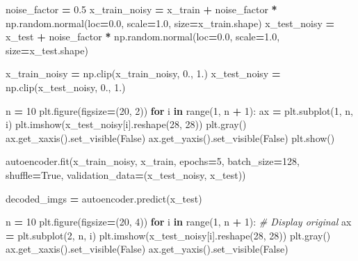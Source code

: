 \documentclass[
  a4paper,
  DIV=11,
  numbers=noendperiod]{scrreprt}
\newenvironment{Shaded}{\begin{snugshade}}{\end{snugshade}}
\newcommand{\BuiltInTok}[1]{#1}
\newcommand{\CommentTok}[1]{\textcolor[rgb]{0.56,0.35,0.01}{\textit{#1}}}
\newcommand{\ControlFlowTok}[1]{\textcolor[rgb]{0.13,0.29,0.53}{\textbf{#1}}}
\newcommand{\DecValTok}[1]{\textcolor[rgb]{0.00,0.00,0.81}{#1}}
\newcommand{\FloatTok}[1]{\textcolor[rgb]{0.00,0.00,0.81}{#1}}
\newcommand{\KeywordTok}[1]{\textcolor[rgb]{0.13,0.29,0.53}{\textbf{#1}}}
\newcommand{\NormalTok}[1]{#1}
\newcommand{\OperatorTok}[1]{\textcolor[rgb]{0.81,0.36,0.00}{\textbf{#1}}}
\newcommand{\VariableTok}[1]{\textcolor[rgb]{0.00,0.00,0.00}{#1}}
\begin{document}
\begin{Shaded}
\begin{Highlighting}[numbers=left,,]
\NormalTok{noise\_factor }\OperatorTok{=} \FloatTok{0.5}
\NormalTok{x\_train\_noisy }\OperatorTok{=}\NormalTok{ x\_train }\OperatorTok{+}\NormalTok{ noise\_factor }\OperatorTok{*}\NormalTok{ np.random.normal(loc}\OperatorTok{=}\FloatTok{0.0}\NormalTok{, scale}\OperatorTok{=}\FloatTok{1.0}\NormalTok{, size}\OperatorTok{=}\NormalTok{x\_train.shape) }
\NormalTok{x\_test\_noisy }\OperatorTok{=}\NormalTok{ x\_test }\OperatorTok{+}\NormalTok{ noise\_factor }\OperatorTok{*}\NormalTok{ np.random.normal(loc}\OperatorTok{=}\FloatTok{0.0}\NormalTok{, scale}\OperatorTok{=}\FloatTok{1.0}\NormalTok{, size}\OperatorTok{=}\NormalTok{x\_test.shape) }

\NormalTok{x\_train\_noisy }\OperatorTok{=}\NormalTok{ np.clip(x\_train\_noisy, }\FloatTok{0.}\NormalTok{, }\FloatTok{1.}\NormalTok{)}
\NormalTok{x\_test\_noisy }\OperatorTok{=}\NormalTok{ np.clip(x\_test\_noisy, }\FloatTok{0.}\NormalTok{, }\FloatTok{1.}\NormalTok{)}


\NormalTok{n }\OperatorTok{=} \DecValTok{10}
\NormalTok{plt.figure(figsize}\OperatorTok{=}\NormalTok{(}\DecValTok{20}\NormalTok{, }\DecValTok{2}\NormalTok{))}
\ControlFlowTok{for}\NormalTok{ i }\KeywordTok{in} \BuiltInTok{range}\NormalTok{(}\DecValTok{1}\NormalTok{, n }\OperatorTok{+} \DecValTok{1}\NormalTok{):}
\NormalTok{    ax }\OperatorTok{=}\NormalTok{ plt.subplot(}\DecValTok{1}\NormalTok{, n, i)}
\NormalTok{    plt.imshow(x\_test\_noisy[i].reshape(}\DecValTok{28}\NormalTok{, }\DecValTok{28}\NormalTok{))}
\NormalTok{    plt.gray()}
\NormalTok{    ax.get\_xaxis().set\_visible(}\VariableTok{False}\NormalTok{)}
\NormalTok{    ax.get\_yaxis().set\_visible(}\VariableTok{False}\NormalTok{)}
\NormalTok{plt.show()}


\NormalTok{autoencoder.fit(x\_train\_noisy, x\_train,}
\NormalTok{                epochs}\OperatorTok{=}\DecValTok{5}\NormalTok{,}
\NormalTok{                batch\_size}\OperatorTok{=}\DecValTok{128}\NormalTok{,}
\NormalTok{                shuffle}\OperatorTok{=}\VariableTok{True}\NormalTok{,}
\NormalTok{                validation\_data}\OperatorTok{=}\NormalTok{(x\_test\_noisy, x\_test))}


\NormalTok{decoded\_imgs }\OperatorTok{=}\NormalTok{ autoencoder.predict(x\_test)}

\NormalTok{n }\OperatorTok{=} \DecValTok{10}
\NormalTok{plt.figure(figsize}\OperatorTok{=}\NormalTok{(}\DecValTok{20}\NormalTok{, }\DecValTok{4}\NormalTok{))}
\ControlFlowTok{for}\NormalTok{ i }\KeywordTok{in} \BuiltInTok{range}\NormalTok{(}\DecValTok{1}\NormalTok{, n }\OperatorTok{+} \DecValTok{1}\NormalTok{):}
    \CommentTok{\# Display original}
\NormalTok{    ax }\OperatorTok{=}\NormalTok{ plt.subplot(}\DecValTok{2}\NormalTok{, n, i)}
\NormalTok{    plt.imshow(x\_test\_noisy[i].reshape(}\DecValTok{28}\NormalTok{, }\DecValTok{28}\NormalTok{))}
\NormalTok{    plt.gray()}
\NormalTok{    ax.get\_xaxis().set\_visible(}\VariableTok{False}\NormalTok{)}
\NormalTok{    ax.get\_yaxis().set\_visible(}\VariableTok{False}\NormalTok{)}


\end{Highlighting}
\end{Shaded}
\end{document}
